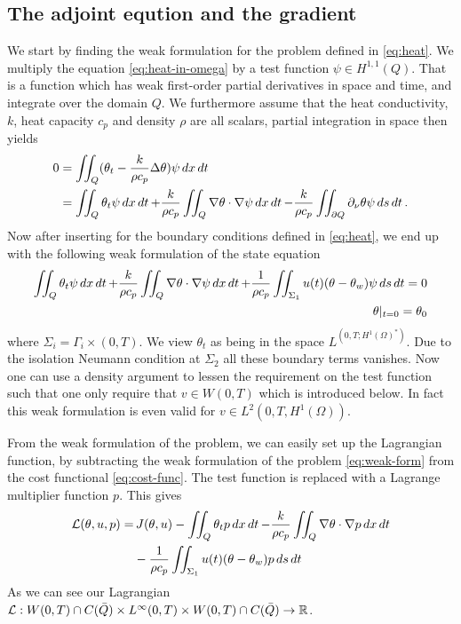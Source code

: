 \subsection{The adjoint eqution and the gradient}
We start by finding the weak formulation for the problem defined in \eqref{eq:heat}. We multiply the equation \eqref{eq:heat-in-omega} by a test function $\psi\in H^{1,1}(Q)$. That is a function which has weak first-order partial derivatives in space and time, and integrate over the domain $Q$. We furthermore assume that the heat conductivity, $k$, heat capacity $c_p$ and density $\rho$ are all scalars, partial integration in space then yields 
\begin{equation}
\begin{aligned}
  0 &= \iint_Q (\theta_t - \frac{k}{\rho c_p}\Delta\theta)\psi\mathop{dx}\mathop{dt}  \\
  &= \iint_Q \theta_t\psi\mathop{dx}\mathop{dt} + \frac{k}{\rho c_p}\iint_Q\nabla\theta \cdot \nabla\psi\mathop{dx}\mathop{dt} - \frac{k}{\rho c_p}\iint_{\partial Q}\partial_\nu\theta\psi\mathop{ds}\mathop{dt}.
\end{aligned}
\end{equation}
Now after inserting for the boundary conditions defined in \eqref{eq:heat}, we end up with the following weak formulation of the state equation
\begin{align}\label{eq:weak-form}
  \iint_Q \theta_t\psi\mathop{dx}\mathop{dt} + \frac{k}{\rho c_p}\iint_Q\nabla\theta \cdot \nabla\psi\mathop{dx}\mathop{dt} + \frac{1}{\rho c_p}\iint_{\Sigma_1} u(t)(\theta - \theta_w)\psi\mathop{ds}\mathop{dt} = 0\\
  \theta|_{t=0} = \theta_0
\end{align}
where $\Sigma_i = \Gamma_i\times(0,T)$. We view $\theta_t$ as being in the space $ L^(0,T;H^1(\Omega)^{*})$. Due to the isolation Neumann condition at $\Sigma_2$ all these boundary terms vanishes. Now one can use a density argument to lessen the requirement on the test function such that one only require that $v \in W(0,T)$ which is introduced below. In fact this weak formulation is even valid for $v \in L^2(0,T,H^1(\Omega))$. 

From the weak formulation of the problem, we can easily set up the Lagrangian function, by subtracting the weak formulation of the problem \eqref{eq:weak-form} from the cost functional \eqref{eq:cost-func}. The test function is replaced with a Lagrange multiplier function $p$. This gives
\begin{equation}
  \begin{aligned}\label{eq:lagrangian-raw}
  \mathcal{L}(\theta, u, p) = &\,J(\theta, u) - \iint_Q \theta_t p\mathop{dx}\mathop{dt} - \frac{k}{\rho c_p}\iint_Q\nabla\theta \cdot \nabla p \mathop{dx}\mathop{dt} \\
  &- \frac{1}{\rho c_p}\iint_{\Sigma_1} u(t)(\theta - \theta_w)p \mathop{ds}\mathop{dt}
  \end{aligned}
\end{equation}
As we can see our Lagrangian $\mathcal{L} : W(0,T)\cap C(\bar{Q}) \times L^{\infty}(0,T) \times  W(0,T) \cap C(\bar{Q}) \rightarrow \mathbb{R}$.

